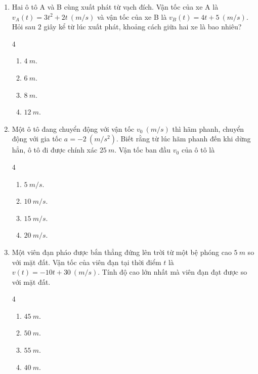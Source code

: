 \documentclass[12pt]{article}
\begin{document}
\begin{enumerate}[label=\textbf{Câu \arabic*.}]
		\item Hai ô tô A và B cùng xuất phát từ vạch đích. Vận tốc của xe A là $v_A(t) = 3t^2 + 2t \ (m/s)$ và vận tốc của xe B là $v_B(t) = 4t + 5 \ (m/s)$. Hỏi sau $2$ giây kể từ lúc xuất phát, khoảng cách giữa hai xe là bao nhiêu?
		\begin{multicols}{4}
			\begin{enumerate}[label=\textbf{\Alph*.}]
				\item $4 \ m$.
				\item $6 \ m$.
				\item $8 \ m$.
				\item $12 \ m$.
			\end{enumerate}
		\end{multicols}
		
		\item Một ô tô đang chuyển động với vận tốc $v_0 \ (m/s)$ thì hãm phanh, chuyển động với gia tốc $a = -2 \ (m/s^2)$. Biết rằng từ lúc hãm phanh đến khi dừng hẳn, ô tô đi được chính xác $25 \ m$. Vận tốc ban đầu $v_0$ của ô tô là
		\begin{multicols}{4}
			\begin{enumerate}[label=\textbf{\Alph*.}]
				\item $5 \ m/s$.
				\item $10 \ m/s$.
				\item $15 \ m/s$.
				\item $20 \ m/s$.
			\end{enumerate}
		\end{multicols}
		
		\item Một viên đạn pháo được bắn thẳng đứng lên trời từ một bệ phóng cao $5 \ m$ so với mặt đất. Vận tốc của viên đạn tại thời điểm $t$ là $v(t) = -10t + 30 \ (m/s)$. Tính độ cao lớn nhất mà viên đạn đạt được so với mặt đất.
		\begin{multicols}{4}
			\begin{enumerate}[label=\textbf{\Alph*.}]
				\item $45 \ m$.
				\item $50 \ m$.
				\item $55 \ m$.
				\item $40 \ m$.
			\end{enumerate}
		\end{multicols}
		

\end{enumerate}
\end{document}
